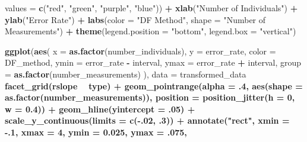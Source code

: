 \documentclass[12pt, twoside]{amherstthesis}
\newenvironment{Shaded}{\begin{snugshade}}{\end{snugshade}}
\newcommand{\DataTypeTok}[1]{\textcolor[rgb]{0.13,0.29,0.53}{#1}}
\newcommand{\DecValTok}[1]{\textcolor[rgb]{0.00,0.00,0.81}{#1}}
\newcommand{\FloatTok}[1]{\textcolor[rgb]{0.00,0.00,0.81}{#1}}
\newcommand{\KeywordTok}[1]{\textcolor[rgb]{0.13,0.29,0.53}{\textbf{#1}}}
\newcommand{\NormalTok}[1]{#1}
\newcommand{\OperatorTok}[1]{\textcolor[rgb]{0.81,0.36,0.00}{\textbf{#1}}}
\newcommand{\StringTok}[1]{\textcolor[rgb]{0.31,0.60,0.02}{#1}}
\begin{document}
\begin{Shaded}
\begin{Highlighting}[]
{{{{{{{{{{                     \DataTypeTok{values =} \KeywordTok{c}\NormalTok{(}\StringTok{"red"}\NormalTok{, }\StringTok{"green"}\NormalTok{, }\StringTok{"purple"}\NormalTok{, }\StringTok{"blue"}\NormalTok{)) }\OperatorTok{+}
\StringTok{  }\KeywordTok{xlab}\NormalTok{(}\StringTok{"Number of Individuals"}\NormalTok{) }\OperatorTok{+}
\StringTok{  }\KeywordTok{ylab}\NormalTok{(}\StringTok{"Error Rate"}\NormalTok{) }\OperatorTok{+}
\StringTok{  }\KeywordTok{labs}\NormalTok{(}\DataTypeTok{color =} \StringTok{"DF Method"}\NormalTok{, }\DataTypeTok{shape =} \StringTok{"Number of Measurements"}\NormalTok{) }\OperatorTok{+}
\StringTok{  }\KeywordTok{theme}\NormalTok{(}\DataTypeTok{legend.position =} \StringTok{"bottom"}\NormalTok{, }\DataTypeTok{legend.box =} \StringTok{"vertical"}\NormalTok{)}


\KeywordTok{ggplot}\NormalTok{(}\KeywordTok{aes}\NormalTok{(}
  \DataTypeTok{x =} \KeywordTok{as.factor}\NormalTok{(number_individuals), }\DataTypeTok{y =}\NormalTok{ error_rate, }\DataTypeTok{color =}\NormalTok{ DF_method,}
  \DataTypeTok{ymin =}\NormalTok{ error_rate }\OperatorTok{-}\StringTok{ }\NormalTok{interval, }\DataTypeTok{ymax =}\NormalTok{ error_rate }\OperatorTok{+}\StringTok{ }\NormalTok{interval,}
  \DataTypeTok{group =} \KeywordTok{as.factor}\NormalTok{(number_measurements)}
\NormalTok{), }\DataTypeTok{data =}\NormalTok{ transformed_data }\OperatorTok{%>%}\StringTok{ }\KeywordTok{filter}\NormalTok{(distribution }\OperatorTok{==}\StringTok{ "Exponential"}\NormalTok{)) }\OperatorTok{+}
\StringTok{  }\KeywordTok{facet_grid}\NormalTok{(rslope }\OperatorTok{~}\StringTok{ }\NormalTok{type) }\OperatorTok{+}
\StringTok{  }\KeywordTok{geom_pointrange}\NormalTok{(}\DataTypeTok{alpha =} \FloatTok{.4}\NormalTok{, }\KeywordTok{aes}\NormalTok{(}\DataTypeTok{shape =} \KeywordTok{as.factor}\NormalTok{(number_measurements)), }
                  \DataTypeTok{position =} \KeywordTok{position_jitter}\NormalTok{(}\DataTypeTok{h =} \DecValTok{0}\NormalTok{, }\DataTypeTok{w =} \FloatTok{0.4}\NormalTok{)) }\OperatorTok{+}
\StringTok{  }\KeywordTok{geom_hline}\NormalTok{(}\DataTypeTok{yintercept =} \FloatTok{.05}\NormalTok{) }\OperatorTok{+}
\StringTok{  }\KeywordTok{scale_y_continuous}\NormalTok{(}\DataTypeTok{limits =} \KeywordTok{c}\NormalTok{(}\OperatorTok{-}\NormalTok{.}\DecValTok{02}\NormalTok{, }\FloatTok{.3}\NormalTok{)) }\OperatorTok{+}
\StringTok{  }\KeywordTok{annotate}\NormalTok{(}\StringTok{"rect"}\NormalTok{, }\DataTypeTok{xmin =} \FloatTok{-.1}\NormalTok{, }\DataTypeTok{xmax =} \DecValTok{4}\NormalTok{, }\DataTypeTok{ymin =} \FloatTok{0.025}\NormalTok{, }\DataTypeTok{ymax =} \FloatTok{.075}\NormalTok{, }
}}}}}}}}}}}
\end{Highlighting}
\end{Shaded}
\end{document}
